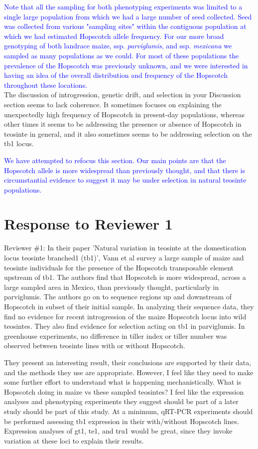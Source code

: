 \documentclass[11pt]{article}
\newcommand{\res}[1]{\noindent \textcolor{blue}{{#1}} \\}
\begin{document}
\res{Note that all the sampling for both phenotyping experiments was limited to a single large population from which we had a large number of seed collected. Seed was collected from various "sampling sites" within the contiguous population at which we had estimated Hopscotch allele frequency. For our more broad genotyping of both landrace maize, ssp. \emph{parviglumis}, and ssp. \emph{mexicana} we sampled as many populations as we could. For most of these populations the prevalence of the Hopscotch was previously unknown, and we were interested in having an idea of the overall distribution and frequency of the Hopscotch throughout these locations.}

The discussion of introgression, genetic drift, and selection in your Discussion section seems to lack coherence.  It sometimes focuses on explaining the unexpectedly high frequency of Hopscotch in present-day populations, whereas other times it seems to be addressing the presence or absence of Hopscotch in teosinte in general, and it also sometimes seems to be addressing selection on the tb1 locus. 

\res{We have attempted to refocus this section.  Our main points are that the Hopscotch allele is more widespread than previously thought, and that there is circumstantial evidence to suggest it may be under selection in natural teosinte populations.}

\section*{Response to Reviewer 1}

Reviewer \#1: In their paper 'Natural variation in teosinte at the domestication locus teosinte branched1 (tb1)', Vann et al survey a large sample of maize and teosinte individuals for the presence of the Hopscotch transposable element upstream of tb1. The authors find that Hopscotch is more widespread, across a large sampled area in Mexico, than previously thought, particularly in parviglumis. The authors go on to sequence regions up and downstream of Hopscotch in subset of their initial sample. In analyzing their sequence data, they find no evidence for recent introgression of the maize Hopscotch locus into wild teosintes. They also find evidence for selection acting on tb1 in parviglumis. In greenhouse experiments, no difference in tiller index or tiller number was observed between teosinte lines with or without Hopscotch. 

They present an interesting result, their conclusions are supported by their data, and the methods they use are appropriate. However, I feel like they need to make some further effort to understand what is happening mechanistically. What is Hopscotch doing in maize vs these sampled teosintes? I feel like the expression analyses and phenotyping experiments they suggest should be part of a later study should be part of this study. At a minimum, qRT-PCR experiments should be performed assessing tb1 expression in their with/without Hopscotch lines. Expression analyses of gt1, te1, and tru1 would be great, since they invoke variation at these loci to explain their results.
\end{document}
